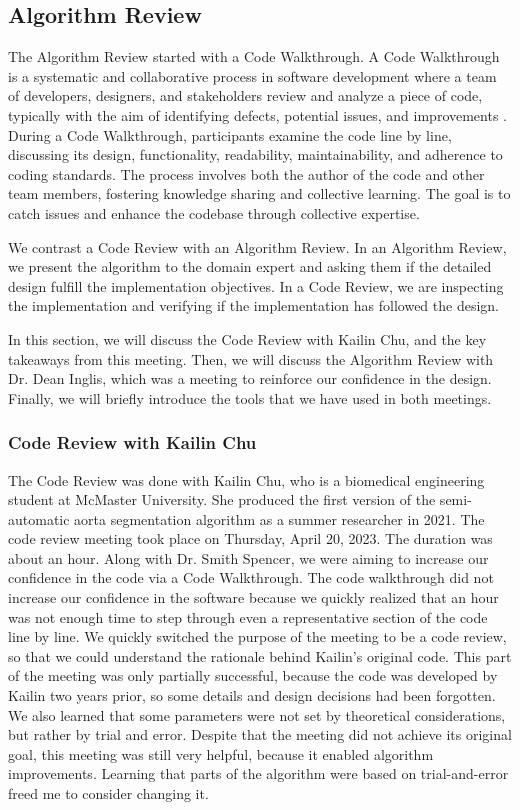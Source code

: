 \subsection{Algorithm Review}

The Algorithm Review started with a Code Walkthrough. A Code Walkthrough is a systematic and collaborative process in software development where a team of developers, designers, and stakeholders review and analyze a piece of code, typically with the aim of identifying defects, potential issues, and improvements \cite{Corporate_2023}. During a Code Walkthrough, participants examine the code line by line, discussing its design, functionality, readability, maintainability, and adherence to coding standards. The process involves both the author of the code and other team members, fostering knowledge sharing and collective learning. The goal is to catch issues and enhance the codebase through collective expertise.

We contrast a Code Review with an Algorithm Review. In an Algorithm Review, we present the algorithm to the domain expert and asking them if the detailed design fulfill the implementation objectives. In a Code Review, we are inspecting the implementation and verifying if the implementation has followed the design. 

In this section, we will discuss the Code Review with Kailin Chu, and the key takeaways from this meeting. Then, we will discuss the Algorithm Review with Dr. Dean Inglis, which was a meeting to reinforce our confidence in the design. Finally, we will briefly introduce the tools that we have used in both meetings.

\subsubsection{Code Review with Kailin Chu}
The Code Review was done with Kailin Chu, who is a biomedical engineering student at McMaster University. She produced the first version of the semi-automatic aorta segmentation algorithm as a summer researcher in 2021. The code review meeting took place on Thursday, April 20, 2023. The duration was about an hour. Along with Dr. Smith Spencer, we were aiming to increase our confidence in the code via a Code Walkthrough. The code walkthrough did not increase our confidence in the software because we quickly realized that an hour was not enough time to step through even a representative section of the code line by line. We quickly switched the purpose of the meeting to be a code review, so that we could understand the rationale behind Kailin's original code. This part of the meeting was only partially successful, because the code was developed by Kailin two years prior, so some details and design decisions had been forgotten. We also learned that some parameters were not set by theoretical considerations, but rather by trial and error. Despite that the meeting did not achieve its original goal, this meeting was still very helpful, because it enabled algorithm improvements. Learning that parts of the algorithm were based on trial-and-error freed me to consider changing it.

